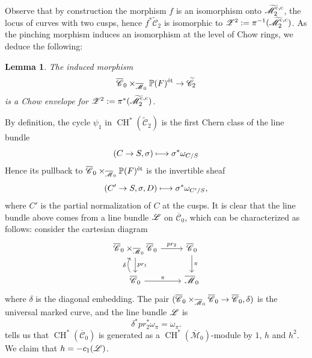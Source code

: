 \documentclass[a4paper, 10pt]{amsart}
\numberwithin{equation}{section}
\numberwithin{subsection}{section}
\newtheorem{lemma}[theorem]{Lemma}
\theoremstyle{definition}
\theoremstyle{remark}
\renewcommand{\mathcal}{\mathscr}
\newcommand\cC{\mathcal{C}} \newcommand\cD{\mathcal{D}}
\newcommand\cM{\mathcal{M}} \newcommand\cN{\mathcal{N}}
\newcommand\arr{\ifinner\to\else\longrightarrow\fi}
\newcommand{\Mbar}{\overline{\cM}}
\newcommand{\Mtilde}{\widetilde{\mathcal M}}
\newcommand{\Cbar}{\overline{\cC}}
\newcommand{\Ctilde}{\widetilde{\mathcal C}}
\newcommand{\ch}[1][*]{\operatorname{CH}^{#1}}
\begin{document}
	Observe that by construction the morphism $f$ is an isomorphism onto $\Mtilde_2^{\rm{c,c}}$, the locus of curves with two cusps, hence $f^*\Ctilde_2$ is isomorphic to $\cZ^2:=\pi^{-1}(\Mtilde_2^{\rm{c,c}})$. As the pinching morphism induces an isomorphism at the level of Chow rings, we deduce the following:
	\begin{lemma}\label{lm:chow envelope Z2}
		The induced morphism
		\[ \Cbar_0 \times_{\Mbar_0} \PP(F)^{\rm \acute{e}t} \arr \Ctilde_2 \]
		is a Chow envelope for $\cZ^2:=\pi^*(\Mtilde_2^{\rm{c,c}})$.
	\end{lemma}
	By definition, the cycle $\psi_1$ in $\ch(\Ctilde_2)$ is the first Chern class of the line bundle
	\[ (C\arr S,\sigma) \longmapsto \sigma^*\omega_{C/S} \]
	Hence its pullback to $\Cbar_0 \times_{\Mbar_0} \PP(F)^{\rm \acute{e}t}$ is the invertible sheaf
	\[ (C'\arr S,\sigma,D)\longmapsto \sigma^*\omega_{C'/S}, \]
	where $C'$ is the partial normalization of $C$ at the cusps.
	It is clear that the line bundle above comes from a line bundle $\cL$ on $\Cbar_0$, which can be characterized as follows: consider the cartesian diagram
	\[
	\begin{tikzcd}
		\Cbar_0 \times_{\Mbar_0} \Cbar_0 \ar[r, "pr_2"] \ar[d, "pr_1"] & \Cbar_0 \ar[d, "\pi"] \\
		\Cbar_0 \ar[r, "\pi"] \ar[u, bend left, "\delta"] & \Mbar_0
	\end{tikzcd}
	\]
	where $\delta$ is the diagonal embedding. The pair $(\Cbar_0\times_{\Mbar_0}\Cbar_0\arr \Cbar_0,\delta)$ is the universal marked curve, and the line bundle $\cL$ is
	\[ \delta^*pr_2^*\omega_{\pi} = \omega_{\pi}. \]
	 tells us that $\ch(\Cbar_0)$ is generated as a $\ch(\Mbar_0)$-module by $1$, $h$ and $h^2$. We claim that $h=-c_1(\cL)$.
	
\end{document}
